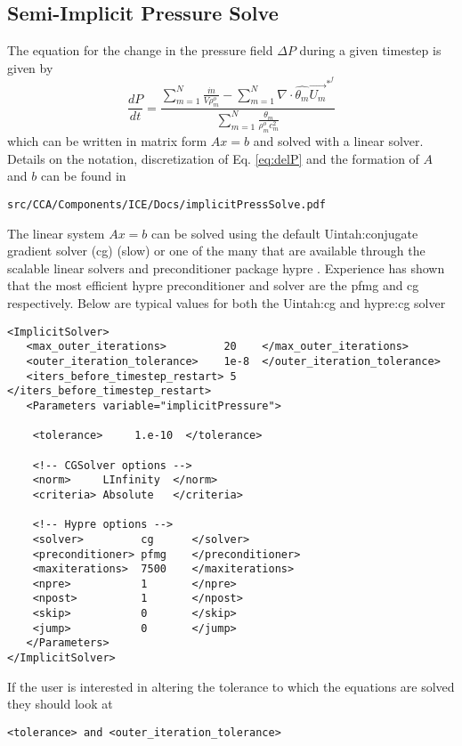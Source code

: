 \subsection{Semi-Implicit Pressure Solve}
The equation for the change in the pressure field $\Delta{P}$ during a given
timestep is given by
%
\begin{equation}
    \label{eq:delP}
     \frac{dP}{dt} = 
     \frac{\sum \limits_{{m}=1}^N  \frac{\dot{m}} {V \rho^{o}_m} 
        -  \sum \limits_{{m}=1}^N \nabla \cdot \widehat{\theta_m} \vec{U_m}^{*^{f}}}
          {\sum \limits_{{m}=1}^N \frac{\theta_m}{\rho^{o}_m c_m^2} }
\end{equation}
%
which can be written in matrix form $Ax = b$ and solved with a linear solver.  Details on the
notation, discretization of Eq. \ref{eq:delP} and the formation of $A$
and $b$ can be found in
%
\begin{Verbatim}[fontsize=\footnotesize]
 src/CCA/Components/ICE/Docs/implicitPressSolve.pdf
\end{Verbatim}
%
The linear system $Ax = b$ can be solved using the default Uintah:conjugate
gradient solver (cg) (slow) or one of the many that are available
through the scalable linear solvers and preconditioner package hypre
\cite{ref:hypre}. Experience has shown that the most efficient hypre
preconditioner and solver are the pfmg and cg respectively.  Below are
typical values for both the Uintah:cg and hypre:cg solver
%
\begin{Verbatim}[fontsize=\footnotesize]
<ImplicitSolver>
   <max_outer_iterations>         20    </max_outer_iterations>
   <outer_iteration_tolerance>    1e-8  </outer_iteration_tolerance>
   <iters_before_timestep_restart> 5    </iters_before_timestep_restart>
   <Parameters variable="implicitPressure">

    <tolerance>     1.e-10  </tolerance>
    
    <!-- CGSolver options -->
    <norm>     LInfinity  </norm>
    <criteria> Absolute   </criteria>

    <!-- Hypre options -->
    <solver>         cg      </solver>
    <preconditioner> pfmg    </preconditioner>
    <maxiterations>  7500    </maxiterations>
    <npre>           1       </npre>
    <npost>          1       </npost>
    <skip>           0       </skip>
    <jump>           0       </jump>
   </Parameters>
</ImplicitSolver>
\end{Verbatim}
%
If the user is interested in altering the tolerance to which the equations are solved they should look at
\begin{Verbatim}[fontsize=\footnotesize]
<tolerance> and <outer_iteration_tolerance>
\end{Verbatim} 
%


